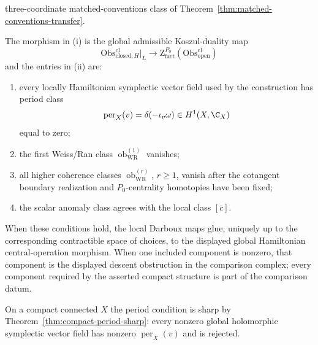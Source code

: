 \begin{thm}
\begin{enumerate}[label=(\roman*)]
      three-coordinate matched-conventions class of
      Theorem~\ref{thm:matched-conventions-transfer}.
  \end{enumerate}
  The morphism in (i) is the global admissible Koszul-duality map
  \[
    \mathrm{Obs}^{\mathrm{cl}}_{\mathrm{closed},H}\big|_L
      \longrightarrow
    \mathrm Z^{P_0}_{\mathrm{fact}}
      (\mathrm{Obs}^{\mathrm{cl}}_{\mathrm{open}})
  \]
  and the entries in (ii) are:
  \begin{enumerate}[label=(\alph*)]
    \item every locally Hamiltonian symplectic vector field used by the
      construction has period class
      \[
        \operatorname{per}_X(v)=
        \delta(-\iota_v\omega)\in H^1(X,\C_X)
      \]
      equal to zero;
    \item the first Weiss/Ran class
      \(\operatorname{ob}^{(1)}_{\mathrm{WR}}\) vanishes;
    \item all higher coherence classes
      \(\operatorname{ob}^{(r)}_{\mathrm{WR}}\), \(r\ge1\), vanish after
      the cotangent boundary realization and \(P_0\)-centrality homotopies
      have been fixed;
    \item the scalar anomaly class agrees with the local class
      \([\bar c]\).
  \end{enumerate}
  When these conditions hold, the local Darboux maps glue, uniquely up to
  the corresponding contractible space of choices, to the displayed
  global Hamiltonian central-operation morphism.  When one included
  component is nonzero, that component is the displayed descent
  obstruction in the comparison complex; every component required
  by the asserted compact structure is part of the comparison datum.

  On a compact connected \(X\) the period condition is sharp by
  Theorem~\ref{thm:compact-period-sharp}: every nonzero global
  holomorphic symplectic vector field has nonzero
  \(\operatorname{per}_X(v)\) and is rejected.
\end{thm}

